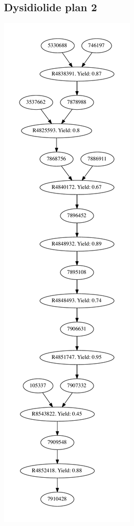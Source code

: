 \documentclass[a4paper,10pt,titlepage]{paper}
\begin{document}
\subsection{Dysidiolide plan 2}
\centering
\includegraphics[scale=0.43]{Synteseplaner/Dysidiolide/plan2.pdf}
\label{Appendix::Dysidiolide2}
\end{document}

